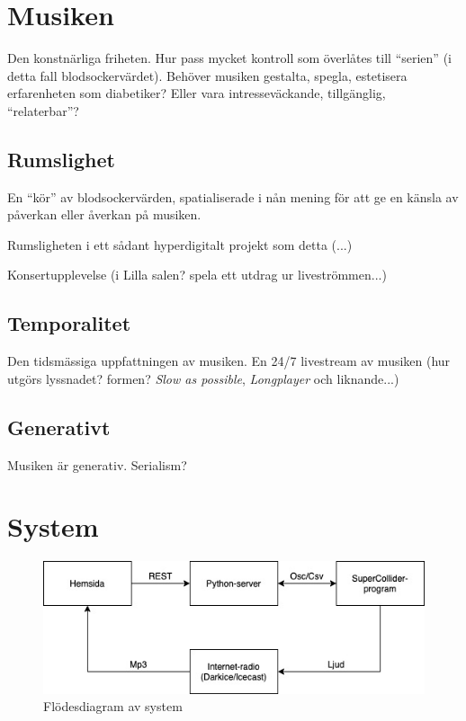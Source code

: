 \documentclass[12pt]{article}
\begin{document}
\section{Musiken}
Den konstnärliga friheten. Hur pass mycket kontroll som överlåtes till \enquote{serien} (i detta fall blodsockervärdet). Behöver musiken gestalta, spegla, estetisera erfarenheten som diabetiker? Eller vara intresseväckande, tillgänglig, \enquote{relaterbar}? 

\subsection{Rumslighet}
En \enquote{kör} av blodsockervärden, spatialiserade i nån mening för att ge en känsla av påverkan eller åverkan på musiken. 

Rumsligheten i ett sådant hyperdigitalt projekt som detta (...)

Konsertupplevelse (i Lilla salen? spela ett utdrag ur liveströmmen...)

\subsection{Temporalitet}
Den tidsmässiga uppfattningen av musiken. En 24/7 livestream av musiken (hur utgörs lyssnadet? formen? \emph{Slow as possible}, \emph{Longplayer} och liknande...)

\subsection{Generativt}
Musiken är generativ. Serialism?

\section{System}
\begin{figure}[h!]
\centering
\includegraphics{../kod/Flowchart-program.jpg}
\caption{Flödesdiagram av system}
\end{figure}



\end{document}
